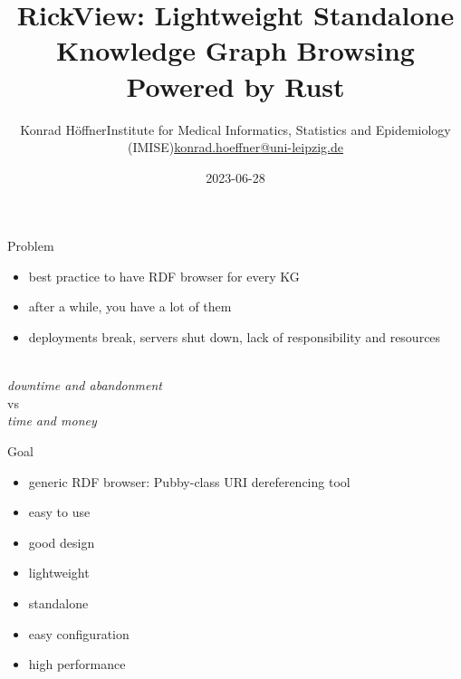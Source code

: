 \documentclass[14pt,aspectratio=169]{beamer}
\date{2023-06-28}
\author{\texorpdfstring{Konrad Höffner\newline{}Institute for Medical Informatics, Statistics and Epidemiology (IMISE)\newline{}\url{konrad.hoeffner@uni-leipzig.de}}{Konrad Höffner}}
\title{RickView: Lightweight Standalone Knowledge Graph Browsing Powered by Rust}
\subtitle{}
\begin{document}
\begin{frame}
\titlepage
\end{frame}

\begin{frame}{Problem}
\begin{itemize}
\item best practice to have RDF browser for every KG 
\item after a while, you have a lot of them
\item deployments break, servers shut down, lack of responsibility and resources
\end{itemize}
~\\
\centering
\emph{downtime and abandonment}\\
vs\\
\emph{time and money}
\end{frame}

\begin{frame}{Goal}
\begin{itemize}
\item generic RDF browser: Pubby-class URI dereferencing tool
\item easy to use
\item good design
\item lightweight
\item standalone%
\item easy configuration 
\item high performance
\end{itemize}
\end{frame}
\end{document}
